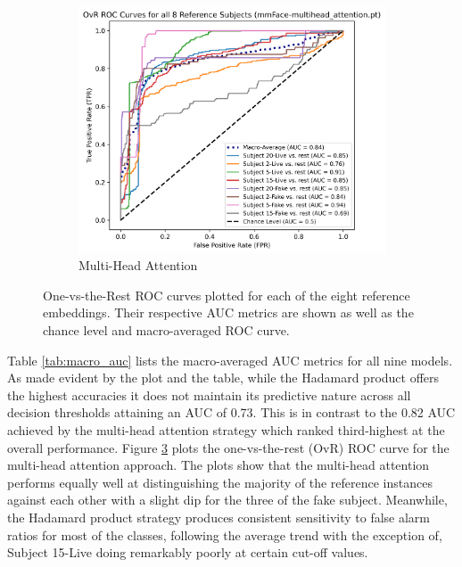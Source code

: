 \documentclass{mpaper}
\begin{document}
\begin{figure}[h!]
\begin{subfigure}[b]{0.3\textwidth}
        \label{fig:roc_concatenate}
    \end{subfigure}
    ~
    \begin{subfigure}[b]{0.31\textwidth}
        \includegraphics[width=\textwidth]{figures/roc_multihead_attention.png}
        \caption{Multi-Head Attention}
        \label{fig:roc_multihead_attention}
    \end{subfigure}
    \vspace{0.3cm}
    \caption{One-vs-the-Rest ROC curves plotted for each of the eight reference embeddings. Their respective AUC metrics are shown as well as the chance level and macro-averaged ROC curve.}
\end{figure}

Table \ref{tab:macro_auc} lists the macro-averaged AUC metrics for all nine models. As made evident by the plot and the table, while the Hadamard product offers the highest accuracies it does not maintain its predictive nature across all decision thresholds attaining an AUC of 0.73. This is in contrast to the 0.82 AUC achieved by the multi-head attention strategy which ranked third-highest at the overall performance. Figure \ref{fig:roc_multihead_attention} plots the one-vs-the-rest (OvR) ROC curve for the multi-head attention approach. The plots show that the multi-head attention performs equally well at distinguishing the majority of the reference instances against each other with a slight dip for the three of the fake subject. Meanwhile, the Hadamard product strategy produces consistent sensitivity to false alarm ratios for most of the classes, following the average trend with the exception of, Subject 15-Live doing remarkably poorly at certain cut-off values.
\end{document}
